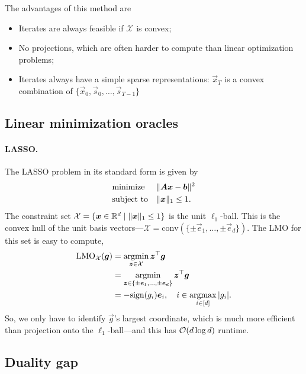 The advantages of this method are
\begin{itemize}
    \item Iterates are always feasible if $\mathcal{X}$ is convex;
    \item No projections, which are often harder to compute than linear optimization problems;
    \item Iterates always have a simple sparse representations: $\vec{x}_T$ is a convex combination of $\{
              \vec{x}_0, \vec{s}_0, \ldots, \vec{s}_{T-1} \}$
\end{itemize}

\subsection{Linear minimization oracles}

\paragraph{LASSO.}

The LASSO problem in its standard form is given by \[
    \begin{aligned}
         & \text{minimize}   &  & \| \bm{A} \bm{x} - \bm{b} \|^2 \\
         & \text{subject to} &  & \| \bm{x} \|_1 \leq 1.
    \end{aligned}
\]
The constraint set $\mathcal{X} = \{ \bm{x} \in \mathbb{R}^d \mid \| \bm{x} \|_1 \leq 1 \}$ is the unit
$\ell_1$-ball. This is the convex hull of the unit basis vectors---$\mathcal{X} = \mathrm{conv}(\{
    \pm \vec{e}_1, \ldots, \pm \vec{e}_d \})$. The LMO for this set is easy to compute,
\begin{align*}
    \mathrm{LMO}_{\mathcal{X}}(\bm{g}) & = \operatorname*{argmin}_{\bm{z}\in \mathcal{X}} \bm{z}^\top \bm{g}                                 \\
                                        & = \operatorname*{argmin}_{\bm{z} \in \{ \pm \bm{e}_1, \ldots, \pm \bm{e}_d \}} \bm{z}^\top \bm{g} \\
                                        & = -\mathrm{sign}(g_i) \bm{e}_i, \quad i \in \operatorname*{argmax}_{i \in [d]} |g_i|.
\end{align*}
So, we only have to identify $\vec{g}$'s largest coordinate, which is much more efficient than
projection onto the $\ell_1$-ball---and this has $\bigo{d \log d}$ runtime.

\subsection{Duality gap}

